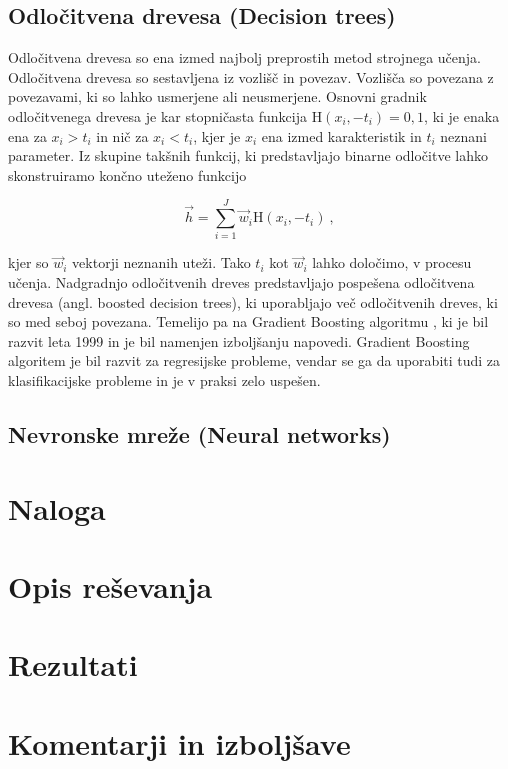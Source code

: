 \documentclass[a4paper]{article}
\begin{document}
\subsection{Odločitvena drevesa (Decision trees)}
Odločitvena drevesa so ena izmed najbolj preprostih metod strojnega učenja. Odločitvena drevesa so sestavljena iz
vozlišč in povezav. Vozlišča so povezana z povezavami, ki so lahko usmerjene ali neusmerjene. Osnovni gradnik
odločitvenega drevesa je kar stopničasta funkcija $\mathrm{H}(x_i,-t_i) = 0,1$, ki je enaka ena za $x_i > t_i$ in
nič za $x_i < t_i$, kjer je $x_i$ ena izmed karakteristik in $t_i$ neznani parameter. Iz skupine takšnih funkcij,
ki predstavljajo binarne odločitve lahko skonstruiramo končno uteženo funkcijo 

\begin{equation}
    \vec{h} = \sum_{i=1}^J{\vec{w}_i \mathrm{H}(x_i, -t_i)}\>,
\end{equation}

kjer so $\vec{w}_i$ vektorji neznanih uteži. Tako $t_i$ kot $\vec{w}_i$ lahko določimo, v procesu učenja. 
Nadgradnjo odločitvenih dreves predstavljajo pospešena odločitvena drevesa (angl. boosted decision trees), ki uporabljajo
več odločitvenih dreves, ki so med seboj povezana. Temelijo pa na Gradient Boosting algoritmu \cite{Friedman_2001}, ki je 
bil razvit leta 1999 in je bil namenjen izboljšanju napovedi. Gradient Boosting algoritem je bil razvit za regresijske 
probleme, vendar se ga da uporabiti tudi za klasifikacijske probleme in je v praksi zelo uspešen. \\

\subsection{Nevronske mreže (Neural networks)}




\section{Naloga}

\section{Opis reševanja}

\section{Rezultati}


\section{Komentarji in izboljšave}


\newpage


\end{document}
